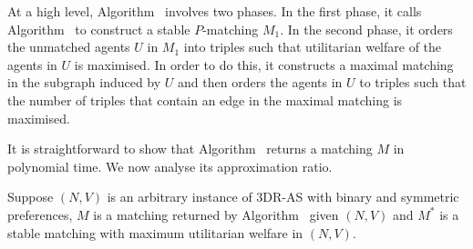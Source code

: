 

At a high level, Algorithm~ involves two phases. In the first phase, it calls Algorithm~ to construct a stable $P$\nobreakdash-matching $M_1$. In the second phase, it orders the unmatched agents $U$ in $M_1$ into triples such that utilitarian welfare of the agents in $U$ is maximised. In order to do this, it constructs a maximal matching in the subgraph induced by $U$ and then orders the agents in $U$ to triples such that the number of triples that contain an edge in the maximal matching is maximised.

It is straightforward to show that Algorithm~ returns a matching $M$ in polynomial time. We now analyse its approximation ratio.

Suppose $(N, V)$ is an arbitrary instance of 3DR-AS with binary and symmetric preferences, $M$ is a matching returned by Algorithm~ given $(N, V)$ and $M^*$ is a stable matching with maximum utilitarian welfare in $(N, V)$. %

